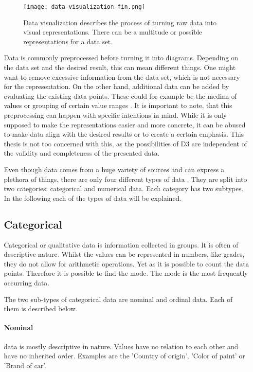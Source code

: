 \begin{figure}
    \texttt{[image: data-visualization-fin.png]}
    \captionsetup{width=0.9\textwidth}
    \caption[data-visualization]{Data visualization describes the process of turning raw data into visual representations. There can be a multitude or possible representations for a data set.}
    \label{fig:data-visualization}
\end{figure}

Data is commonly preprocessed before turning it into diagrams. Depending on the data set and the desired result, this can mean different things. One might want to remove excessive information from the data set, which is not necessary for the representation. On the other hand, additional data can be added by evaluating the existing data points. These could for example be the median of values or grouping of certain value ranges \cite{garcia2015data}. It is important to note, that this preprocessing can happen with specific intentions in mind. While it is only supposed to make the representations easier and more concrete, it can be abused to make data align with the desired results or to create a certain emphasis. This thesis is not too concerned with this, as the possibilities of D3 are independent of the validity and completeness of the presented data.

Even though data comes from a huge variety of sources and can express a plethora of things, there are only four different types of data \cite{henze_2021}. They are split into two categories: categorical and numerical data. Each category has two subtypes. In the following each of the types of data will be explained.

\subsection{Categorical}

Categorical or qualitative data is information collected in groups. It is often of descriptive nature. Whilst the values can be represented in numbers, like grades, they do not allow for arithmetic operations. Yet as it is possible to count the data points. Therefore it is possible to find the mode. The mode is the most frequently occurring data.

The two sub-types of categorical data are nominal and ordinal data. Each of them is described below.

\paragraph{Nominal}
data is mostly descriptive in nature. Values have no relation to each other and have no inherited order. Examples are the 'Country of origin', 'Color of paint' or 'Brand of car'.

